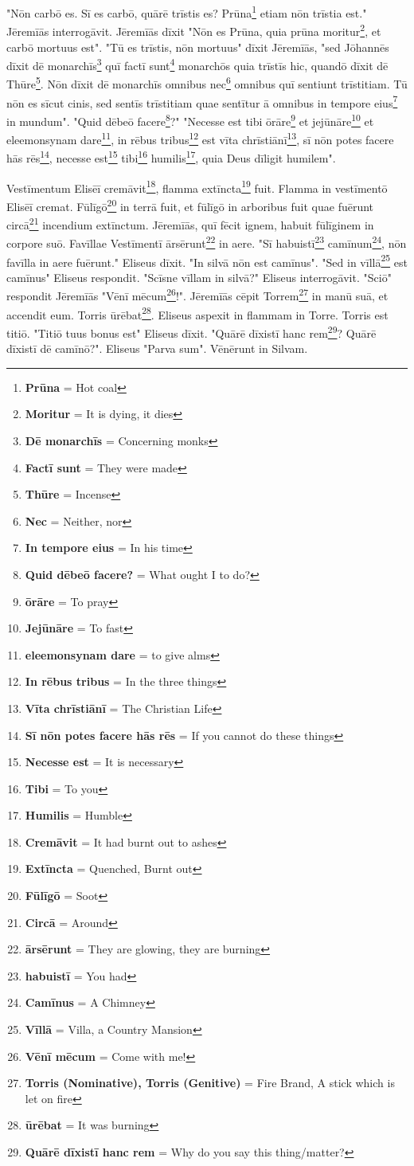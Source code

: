 "Nōn carbō es. Sī es carbō, quārē trīstis es? Prūna\footnote{\textbf{Prūna} = Hot coal} etiam nōn trīstia est." Jēremīās interrogāvit. Jēremīās dīxit "Nōn es Prūna, quia prūna moritur\footnote{\textbf{Moritur} = It is dying, it dies}, et carbō mortuus est". "Tū es trīstis, nōn mortuus" dīxit Jēremīās, "sed Jōhannēs dīxit dē monarchīs\footnote{\textbf{Dē monarchīs} = Concerning monks} quī factī sunt\footnote{\textbf{Factī sunt} = They were made} monarchōs quia trīstīs hic, quandō dīxit dē Thūre\footnote{\textbf{Thūre} = Incense}. Nōn dīxit dē monarchīs omnibus nec\footnote{\textbf{Nec} = Neither, nor} omnibus quī sentiunt trīstitiam. Tū nōn es sīcut cinis, sed sentīs trīstitiam quae sentītur ā omnibus in tempore eius\footnote{\textbf{In tempore eius} = In his time} in mundum". "Quid dēbeō facere\footnote{\textbf{Quid dēbeō facere?} = What ought I to do?}?" "Necesse est tibi ōrāre\footnote{\textbf{ōrāre} = To pray} et jejūnāre\footnote{\textbf{Jejūnāre} = To fast} et eleemonsynam dare\footnote{\textbf{eleemonsynam dare} = to give alms}, in rēbus tribus\footnote{\textbf{In rēbus tribus} = In the three things} est vīta chrīstiānī\footnote{\textbf{Vīta chrīstiānī} = The Christian Life}, sī nōn potes facere hās rēs\footnote{\textbf{Sī nōn potes facere hās rēs} = If you cannot do these things}, necesse est\footnote{\textbf{Necesse est} = It is necessary} tibi\footnote{\textbf{Tibi} = To you} humilis\footnote{\textbf{Humilis} = Humble}, quia Deus dīligit humilem".\par 
Vestīmentum Elisēī cremāvit\footnote{\textbf{Cremāvit} = It had burnt out to ashes}, flamma extīncta\footnote{\textbf{Extīncta} = Quenched, Burnt out} fuit. Flamma in vestīmentō Elisēī cremat. Fūlīgō\footnote{\textbf{Fūlīgō} = Soot} in terrā fuit, et fūlīgō in arboribus fuit quae fuērunt circā\footnote{\textbf{Circā} = Around} incendium extīnctum. Jēremīās, quī fēcit ignem, habuit fūlīginem in corpore suō. Favīllae Vestīmentī ārsērunt\footnote{\textbf{ārsērunt} = They are glowing, they are burning} in aere. "Sī habuistī\footnote{\textbf{habuistī} = You had} camīnum\footnote{\textbf{Camīnus} = A Chimney}, nōn favīlla in aere fuērunt." Eliseus dīxit. "In silvā nōn est camīnus". "Sed in vīllā\footnote{\textbf{Vīllā} = Villa, a Country Mansion} est camīnus" Eliseus respondit. "Scīsne vīllam in silvā?" Eliseus interrogāvit. "Sciō" respondit Jēremīās "Vēnī mēcum\footnote{\textbf{Vēnī mēcum} = Come with me!}!". Jēremīās cēpit Torrem\footnote{\textbf{Torris (Nominative), Torris (Genitive)} = Fire Brand, A stick which is let on fire} in manū suā, et accendit eum. Torris ūrēbat\footnote{\textbf{ūrēbat} = It was burning}. Eliseus aspexit in flammam in Torre. Torris est titiō. "Titiō tuus bonus est" Eliseus dīxit. "Quārē dīxistī hanc rem\footnote{\textbf{Quārē dīxistī hanc rem} = Why do you say this thing/matter?}? Quārē dīxistī dē camīnō?". Eliseus "Parva sum". Vēnērunt in Silvam. 

